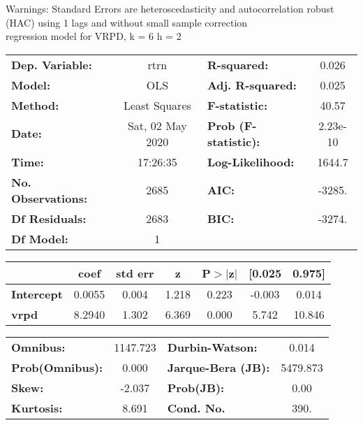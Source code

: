 Warnings: \newline
 [1] Standard Errors are heteroscedasticity and autocorrelation robust (HAC) using 1 lags and without small sample correction\\ 

regression model for VRPD, k = 6 h = 2\begin{center}
\begin{tabular}{lclc}
\toprule
\textbf{Dep. Variable:}    &       rtrn       & \textbf{  R-squared:         } &     0.026   \\
\textbf{Model:}            &       OLS        & \textbf{  Adj. R-squared:    } &     0.025   \\
\textbf{Method:}           &  Least Squares   & \textbf{  F-statistic:       } &     40.57   \\
\textbf{Date:}             & Sat, 02 May 2020 & \textbf{  Prob (F-statistic):} &  2.23e-10   \\
\textbf{Time:}             &     17:26:35     & \textbf{  Log-Likelihood:    } &    1644.7   \\
\textbf{No. Observations:} &        2685      & \textbf{  AIC:               } &    -3285.   \\
\textbf{Df Residuals:}     &        2683      & \textbf{  BIC:               } &    -3274.   \\
\textbf{Df Model:}         &           1      & \textbf{                     } &             \\
\bottomrule
\end{tabular}
\begin{tabular}{lcccccc}
                   & \textbf{coef} & \textbf{std err} & \textbf{z} & \textbf{P$> |$z$|$} & \textbf{[0.025} & \textbf{0.975]}  \\
\midrule
\textbf{Intercept} &       0.0055  &        0.004     &     1.218  &         0.223        &       -0.003    &        0.014     \\
\textbf{vrpd}      &       8.2940  &        1.302     &     6.369  &         0.000        &        5.742    &       10.846     \\
\bottomrule
\end{tabular}
\begin{tabular}{lclc}
\textbf{Omnibus:}       & 1147.723 & \textbf{  Durbin-Watson:     } &    0.014  \\
\textbf{Prob(Omnibus):} &   0.000  & \textbf{  Jarque-Bera (JB):  } & 5479.873  \\
\textbf{Skew:}          &  -2.037  & \textbf{  Prob(JB):          } &     0.00  \\
\textbf{Kurtosis:}      &   8.691  & \textbf{  Cond. No.          } &     390.  \\
\bottomrule
\end{tabular}
\end{center}

